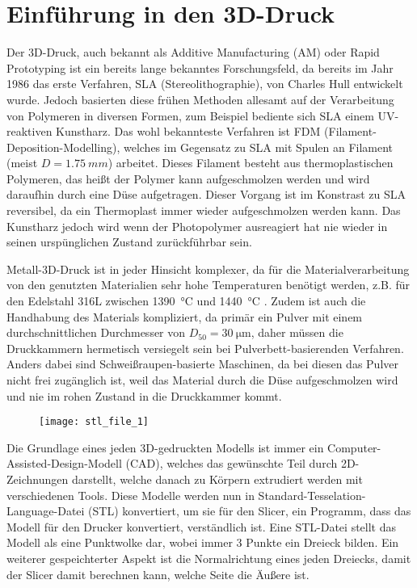 \documentclass[main.tex]{subfiles}
\begin{document}
\section{Einführung in den 3D-Druck}
Der 3D-Druck, auch bekannt als Additive Manufacturing (AM) oder Rapid Prototyping ist ein bereits lange bekanntes Forschungsfeld, da bereits im Jahr 1986 das erste Verfahren, SLA (Stereolithographie), von Charles Hull entwickelt wurde. Jedoch basierten diese frühen Methoden allesamt auf der Verarbeitung von Polymeren in diversen Formen, zum Beispiel bediente sich SLA einem UV-reaktiven Kunstharz. Das wohl bekannteste Verfahren ist FDM (Filament-Deposition-Modelling), welches im Gegensatz zu SLA mit Spulen an Filament (meist $D=\qty{1.75}{mm}$) arbeitet. Dieses Filament besteht aus thermoplastischen Polymeren, das heißt der Polymer kann aufgeschmolzen werden und wird daraufhin durch eine Düse aufgetragen. Dieser Vorgang ist im Konstrast zu SLA reversibel, da ein Thermoplast immer wieder aufgeschmolzen werden kann.\parencite{BHATIA20231060} Das Kunstharz jedoch wird wenn der Photopolymer ausreagiert hat nie wieder in seinen urspünglichen Zustand zurückführbar sein.\parencite{FACUNDO_1}

Metall-3D-Druck ist in jeder Hinsicht komplexer, da für die Materialverarbeitung von den genutzten Materialien sehr hohe Temperaturen benötigt werden, z.B. für den Edelstahl 316L zwischen \qty{1390}{\celsius} und \qty{1440}{\degreeCelsius} \parencite{610LSTEEL}. Zudem ist auch die Handhabung des Materials kompliziert, da primär ein Pulver mit einem durchschnittlichen Durchmesser von $D_{50}=\SI{30}{\micro\meter}$\parencite[~S.3]{ZAKRZEWSKI2020115}, daher müssen die Druckkammern hermetisch versiegelt sein bei Pulverbett-basierenden Verfahren.
Anders dabei sind Schweißraupen-basierte Maschinen, da bei diesen das Pulver nicht frei zugänglich ist, weil das Material durch die Düse aufgeschmolzen wird und nie im rohen Zustand in die Druckkammer kommt.

\begin{figure}[h!]
\begin{center}
	\texttt{[image: stl\_file\_1]}
	\label{img:stl_1}
\end{center}
\end{figure}	

Die Grundlage eines jeden 3D-gedruckten Modells ist immer ein Computer-Assisted-Design-Modell (CAD), welches das gewünschte Teil durch 2D-Zeichnungen darstellt, welche danach zu Körpern extrudiert werden mit verschiedenen Tools. Diese Modelle werden nun in Standard-Tesselation-Language-Datei (STL) konvertiert, um sie für den Slicer, ein Programm, dass das Modell für den Drucker konvertiert, verständlich ist. Eine STL-Datei stellt das Modell als eine Punktwolke dar, wobei immer 3 Punkte ein Dreieck bilden. Ein weiterer gespeichterter Aspekt ist die Normalrichtung eines jeden Dreiecks, damit der Slicer damit berechnen kann, welche Seite die Äußere ist. 
\end{document}
